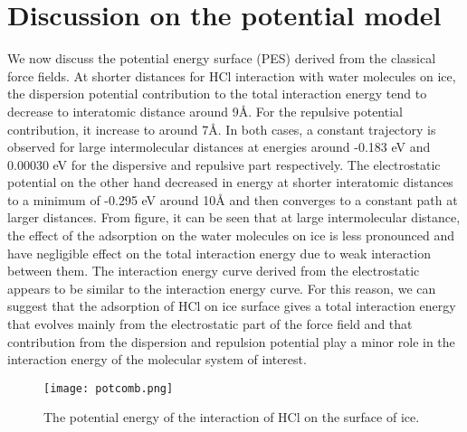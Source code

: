 \documentclass[a4paper,11pt]{report}
\begin{document}
\section{Discussion on the potential model}
We now discuss the potential energy surface (PES) derived from the classical force fields. At shorter distances for HCl interaction with water molecules on ice, the dispersion potential contribution to the total interaction energy tend to decrease to interatomic distance around 9{{\AA}}. For the repulsive potential contribution, it increase to around 7{{\AA}}. In both cases, a constant trajectory is observed for large intermolecular distances at energies around -0.183 eV and 0.00030 eV for the dispersive and repulsive part respectively. The electrostatic potential on the other hand decreased in energy at shorter interatomic distances to a minimum of -0.295 eV around 10{{\AA}} and then converges to a constant path at larger distances. From figure, it can be seen that at large intermolecular distance, the effect of the adsorption on the water molecules on ice is less pronounced and have negligible effect on the total interaction energy due to weak interaction between them. The interaction energy curve derived from the electrostatic appears to be similar to the interaction energy curve. For this reason, we can suggest that the adsorption of HCl on ice surface gives a total interaction energy that evolves mainly from the electrostatic part of the force field and that contribution from the dispersion and repulsion potential play a minor role in the interaction energy of the molecular system of interest.

\begin{figure}[H]\large
\texttt{[image: potcomb.png]}
\caption{The potential energy of the interaction of HCl on the surface of ice.}
\label{figure6}
\end{figure}
\end{document}
